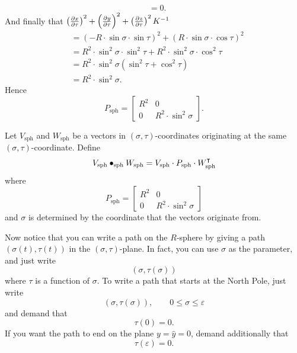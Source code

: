 \documentclass{ximera}
\begin{document}
\begin{problem}
\begin{freeResponse}
\begin{align*}
      &= 0.
    \end{align*}
    And finally that $\left(\pp[x]{\tau}\right)^2 + \left(\pp[y]{\tau}\right)^2 + \left(\pp[z]{\tau}\right)^2K^{-1}$
     \begin{align*}
       &= \left(-R\cdot \sin\sigma\cdot \sin \tau \right)^2 + \left( R\cdot \sin\sigma\cdot \cos\tau \right)^2 \\
       &= R^2\cdot \sin^2\sigma\cdot \sin^2 \tau + R^2\cdot \sin^2\sigma\cdot \cos^2\tau \\
       &= R^2\cdot \sin^2\sigma\left(\sin^2 \tau + \cos^2\tau\right) \\
       &= R^2\cdot \sin^2\sigma.
     \end{align*}
     Hence
     \[
     P_\mathrm{sph} =
  \begin{bmatrix}
    R^2 & 0 \\
    0 & R^2\cdot\sin^2 \sigma
  \end{bmatrix}.
     \]
  \end{freeResponse}
\end{problem}

\begin{definition}
  Let $V_\mathrm{sph}$ and $W_\mathrm{sph}$ be a vectors in
  $(\sigma,\tau)$-coordinates originating at the same
  $(\sigma,\tau)$-coordinate. Define
  \[
  V_\mathrm{sph} \bullet_\mathrm{sph} W_\mathrm{sph} = V_\mathrm{sph} \cdot P_\mathrm{sph} \cdot W_\mathrm{sph}^\transpose
  \]
  where
  \[
  P_\mathrm{sph} =
  \begin{bmatrix}
    R^2 & 0 \\
    0 & R^2\cdot\sin^2 \sigma
  \end{bmatrix}
  \]
  and $\sigma$ is determined by the coordinate that the vectors
  originate from.
\end{definition}


Now notice that you can write a path on the $R$-sphere by giving a path
$\left( \sigma(t),\tau(t)\right)$ in the $(\sigma,\tau)$-plane. In
fact, you can use $\sigma$ as the parameter, and just write
\[
\left(\sigma,\tau(\sigma)\right)
\]
where $\tau$ is a function of $\sigma$. To write a path that starts at
the North Pole, just write%
\[
\left(\sigma,\tau(\sigma)\right), \qquad 0\leq\sigma\leq\varepsilon
\]
and demand that
\[
\tau(0) =0.
\]
If you want the path to end on the plane $y=\hat{y}=0$, demand
additionally that
\[
\tau(\varepsilon) =0.
\]

\end{document}
